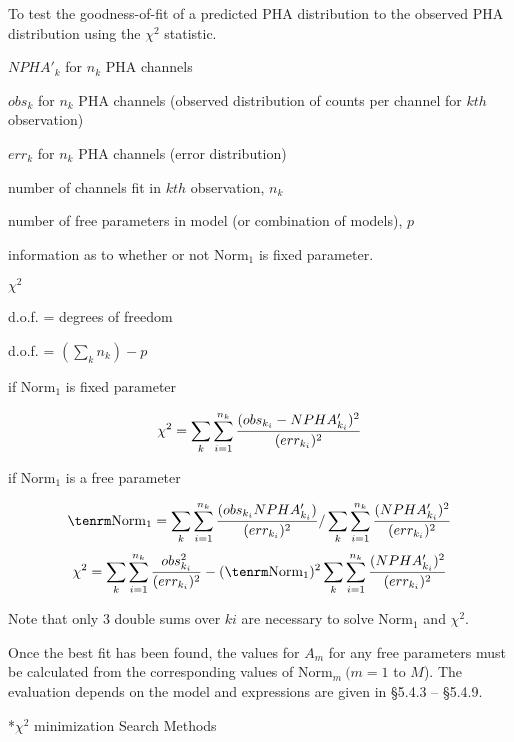 {\list 
 

To test the goodness-of-fit of a predicted PHA distribution to the
observed PHA distribution using the $\chi^{2}$ statistic.
 

$NPHA'_k$ for $n_k$ PHA channels

$obs_k$ for $n_k$ PHA channels (observed distribution of counts per
channel for $kth$ observation)

$err_k$ for $n_k$ PHA channels (error distribution)

number of channels fit in $kth$ observation, $n_k$

number of free parameters in model (or combination of models), $p$

information as to whether or not Norm$_{1}$ is fixed parameter.
 
 
$\chi^{2}$

d.o.f. =  degrees of freedom


d.o.f. = $\left(\sum_k n_k \right) - p$

if Norm$_{1}$ is fixed parameter

}

$$\chi^{2} = \sum_k \sum_{i=1}^{n_k} {(obs_{k_i}-NPHA'_{k_i})^{2}\over (err_{k_i})^{2}}$$

{\list
 
if Norm$_{1}$ is a free parameter

}

$${\rm Norm}_{1} = \sum_k \sum_{i=1}^{n_k} {(obs_{k_i}NPHA'_{k_i})\over
(err_{k_i})^{2}}/ \sum_k \sum_{i=1}^{n_k} {(NPHA'_{k_i})^{2}\over (err_{k_i})^{2}}$$
$$\chi^{2} = \sum_k \sum_{i=1}^{n_k} {obs_{k_i}^{2}\over
(err_{k_i})^{2}} - ({\rm Norm}_{1})^{2}
\sum_k \sum_{i=1}^{n_k} {(NPHA'_{k_i})^{2}\over (err_{k_i})^{2}}$$

{\list

Note that only 3 double sums over $ki$ are necessary to solve Norm$_{1}$ and $\chi^{2}$.

Once the best fit has been found,
the values for $A_m$ for any free parameters must be calculated from
the
corresponding values of Norm$_m~ (m=1$ to $M$).
The evaluation depends on the model and expressions are given in
\S5.4.3 -- \S5.4.9.

}
 
\**$\chi^{2}$ minimization Search Methods

